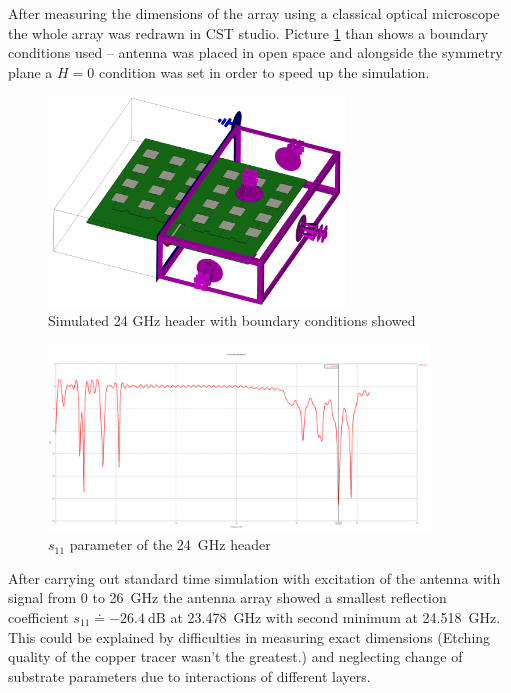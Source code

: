 After measuring the dimensions of the array using a classical optical microscope the whole array was redrawn in CST studio.
Picture \ref{fig:boundaries} than shows a boundary conditions used -- antenna was placed in open space and alongside the symmetry plane a $H=0$ condition was set in order to speed up the simulation.

\begin{figure}[h!]
	\centering
	\includegraphics[width=0.7\textwidth]{../img/boundaries.png}
	\caption[Simulated 24 GHz header with boundary conditions showed]{Simulated 24 GHz header with boundary conditions showed}
	\label{fig:boundaries}
\end{figure}

\begin{figure}[h!]
	\centering
	\includegraphics[width=0.9\textwidth]{../img/s11.png}
	\caption[$s_{11}$ parameter of the 24~GHz header]{$s_{11}$ parameter of the 24~GHz header}
	\label{fig:s11}
\end{figure}

After carrying out standard time simulation with excitation of the antenna with signal from 0 to 26~GHz the antenna array showed a smallest reflection coefficient $s_{11} \doteq -26.4 \mathrm{~dB}$ at 23.478~GHz with second minimum at 24.518~GHz.
This could be explained by difficulties in measuring exact dimensions (Etching quality of the copper tracer wasn't the greatest.) and neglecting change of substrate parameters due to interactions of different layers.


